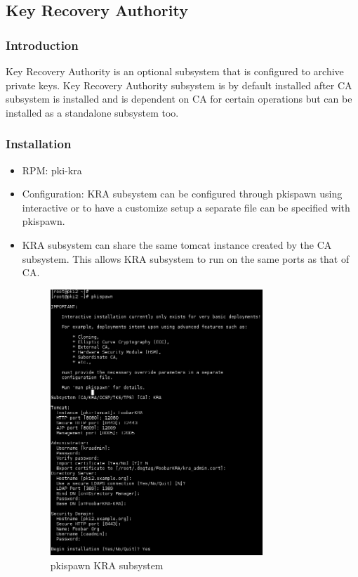 \documentclass[a4paper]{article}
\begin{document}
\subsection{Key Recovery Authority}
\subsubsection{Introduction}
Key Recovery Authority is an optional subsystem that is configured to archive private keys. Key Recovery Authority
subsystem is by default installed after CA subsystem is installed and is dependent on CA for certain operations
but can be installed as a standalone subsystem too.
\subsubsection{Installation}
\begin{itemize}
    \item RPM: pki-kra
    \item Configuration: KRA subsystem can be configured through pkispawn using interactive or to have a customize
        setup a separate file can be specified with pkispawn.

    \item KRA subsystem can share the same tomcat instance created by the CA subsystem. This allows KRA subsystem
        to run on the same ports as that of CA.

        \begin{figure}[H]
            \centering
            \includegraphics[width=80mm]{pkispawn-kra.png}
            \caption{pkispawn KRA subsystem}
        \end{figure}
\end{itemize}
\end{document}
